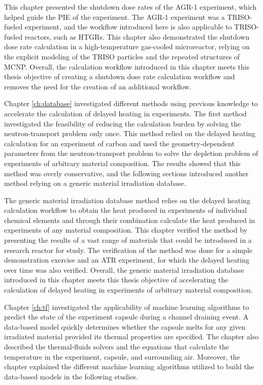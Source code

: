 This chapter presented the shutdown dose rates of the AGR-1 experiment, which helped guide the PIE of the experiment.
The AGR-1 experiment was a TRISO-fueled experiment, and the workflow introduced here is also applicable to TRISO-fueled reactors, such as HTGRs.
This chapter also demonstrated the shutdown dose rate calculation in a high-temperature gas-cooled microreactor, relying on the explicit modeling of the TRISO particles and the repeated structures of MCNP.
Overall, the calculation workflow introduced in this chapter meets this thesis objective of creating a shutdown dose rate calculation workflow and removes the need for the creation of an additional workflow.


Chapter \ref{ch:database} investigated different methods using previous knowledge to accelerate the calculation of delayed heating in experiments.
The first method investigated the feasibility of reducing the calculation burden by solving the neutron-transport problem only once.
This method relied on the delayed heating calculation for an experiment of carbon and used the geometry-dependent parameters from the neutron-transport problem to solve the depletion problem of experiments of arbitrary material composition.
The results showed that this method was overly conservative, and the following sections introduced another method relying on a generic material irradiation database.

The generic material irradiation database method relies on the delayed heating calculation workflow to obtain the heat produced in experiments of individual chemical elements and through their combination calculate the heat produced in experiments of any material composition.
This chapter verified the method by presenting the results of a vast range of materials that could be introduced in a research reactor for study.
The verification of the method was done for a simple demonstration exercise and an ATR experiment, for which the delayed heating over time was also verified.
Overall, the generic material irradiation database introduced in this chapter meets this thesis objective of accelerating the calculation of delayed heating in experiments of arbitrary material composition.

Chapter \ref{ch:tf} investigated the applicability of machine learning algorithms to predict the state of the experiment capsule during a channel draining event.
A data-based model quickly determines whether the capsule melts for any given irradiated material provided its thermal properties are specified.
The chapter also described the thermal-fluids solvers and the equations that calculate the temperature in the experiment, capsule, and surrounding air.
Moreover, the chapter explained the different machine learning algorithms utilized to build the data-based models in the following studies.

